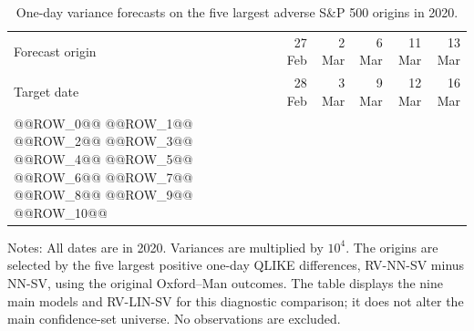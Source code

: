 \begin{table}[p]
\centering
\begin{threeparttable}
\caption{One-day variance forecasts on the five largest adverse S\&P 500 origins in 2020.}
\label{tab:sp500-five-dates}
\scriptsize
\setlength{\tabcolsep}{3pt}
\begin{tabular*}{\textwidth}{@{\extracolsep{\fill}}lrrrrr@{}}
\toprule
Forecast origin & 27 Feb & 2 Mar & 6 Mar & 11 Mar & 13 Mar \\
Target date & 28 Feb & 3 Mar & 9 Mar & 12 Mar & 16 Mar \\
\midrule
@@ROW_0@@
@@ROW_1@@
@@ROW_2@@
@@ROW_3@@
@@ROW_4@@
@@ROW_5@@
@@ROW_6@@
@@ROW_7@@
@@ROW_8@@
@@ROW_9@@
\midrule
@@ROW_10@@
\bottomrule
\end{tabular*}
\begin{tablenotes}[flushleft]
\footnotesize
\item Notes: All dates are in 2020. Variances are multiplied by $10^4$. The origins are selected by the five largest positive one-day QLIKE differences, RV-NN-SV minus NN-SV, using the original Oxford--Man outcomes. The table displays the nine main models and RV-LIN-SV for this diagnostic comparison; it does not alter the main confidence-set universe. No observations are excluded.
\end{tablenotes}
\end{threeparttable}
\end{table}
